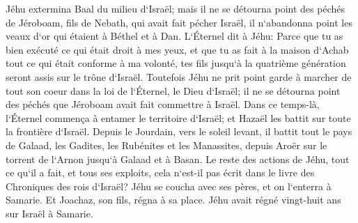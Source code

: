 \verse Jéhu extermina Baal du milieu d`Israël; 
\verse mais il ne se détourna point des péchés de Jéroboam, fils de Nebath, qui avait fait pécher Israël, il n`abandonna point les veaux d`or qui étaient à Béthel et à Dan. 
\verse L`Éternel dit à Jéhu: Parce que tu as bien exécuté ce qui était droit à mes yeux, et que tu as fait à la maison d`Achab tout ce qui était conforme à ma volonté, tes fils jusqu`à la quatrième génération seront assis sur le trône d`Israël. 
\verse Toutefois Jéhu ne prit point garde à marcher de tout son coeur dans la loi de l`Éternel, le Dieu d`Israël; il ne se détourna point des péchés que Jéroboam avait fait commettre à Israël. 
\verse Dans ce temps-là, l`Éternel commença à entamer le territoire d`Israël; et Hazaël les battit sur toute la frontière d`Israël. 
\verse Depuis le Jourdain, vers le soleil levant, il battit tout le pays de Galaad, les Gadites, les Rubénites et les Manassites, depuis Aroër sur le torrent de l`Arnon jusqu`à Galaad et à Basan. 
\verse Le reste des actions de Jéhu, tout ce qu`il a fait, et tous ses exploits, cela n`est-il pas écrit dans le livre des Chroniques des rois d`Israël? 
\verse Jéhu se coucha avec ses pères, et on l`enterra à Samarie. Et Joachaz, son fils, régna à sa place. 
\verse Jéhu avait régné vingt-huit ans sur Israël à Samarie. 

